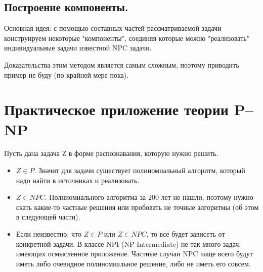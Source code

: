 \subsection*{Построение компоненты.}

Основная идея: с помощью составных частей рассматриваемой задачи конструируем некоторые "компоненты"{}, соединяя которые можно "реализовать"{} индивидуальные задачи известной NPC задачи. 

Доказательства этим методом является самым сложным, поэтому приводить пример не буду (по крайней мере пока).

\section{Практическое приложение теории P--NP}

Пусть дана задача Z в форме распознавания, которую нужно решить. 
\begin{itemize}
	\item $Z\in P$. Значит для задачи существует полиномиальный алгоритм,
		который надо найти в источниках и реализовать.
	\item  $Z \in NPC$. Полниомиального алгоритма за 200 лет не нашли,
		поэтому нужно скать какие-то частные решения или пробовать не
		точные алгоритмы (об этом в следующей части).
	\item Если неизвестно, что  $Z\in P$ или  $Z \in NPC$, то всё будет
		зависеть от конкретной задачи. В классе NPI (NP Intermediate) не
		так много задач, имеющих осмысленное приложение. Частные случаи
		NPC чаще всего будут иметь либо очевидное полиномиальное
		решение, либо не иметь его совсем.
\end{itemize}











